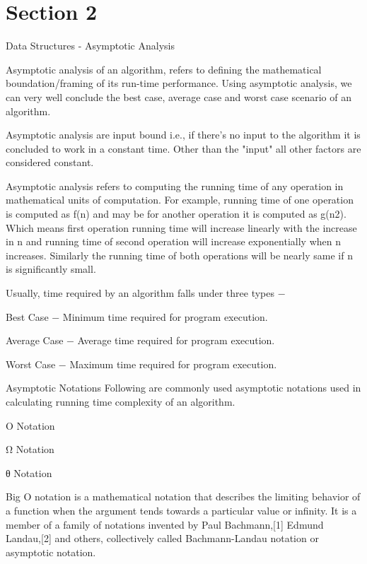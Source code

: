 \documentclass{beamer}
\begin{document}
\section{Section 2}
\begin{frame}

Data Structures - Asymptotic Analysis
 
Asymptotic analysis of an algorithm, refers to defining the mathematical boundation/framing of its run-time performance. Using asymptotic analysis, we can very well conclude the best case, average case and worst case scenario of an algorithm.

Asymptotic analysis are input bound i.e., if there's no input to the algorithm it is concluded to work in a constant time. Other than the "input" all other factors are considered constant.

Asymptotic analysis refers to computing the running time of any operation in mathematical units of computation. For example, running time of one operation is computed as f(n) and may be for another operation it is computed as g(n2). Which means first operation running time will increase linearly with the increase in n and running time of second operation will increase exponentially when n increases. Similarly the running time of both operations will be nearly same if n is significantly small.
\end{frame}
\begin{frame}

Usually, time required by an algorithm falls under three types −

Best Case − Minimum time required for program execution.

Average Case − Average time required for program execution.

Worst Case − Maximum time required for program execution.
\end{frame}
\begin{frame}
Asymptotic Notations
Following are commonly used asymptotic notations used in calculating running time complexity of an algorithm.

Ο Notation

Ω Notation

θ Notation
\end{frame}
\begin{frame}
Big O notation is a mathematical notation that describes the limiting behavior of a function when the argument tends towards a particular value or infinity. It is a member of a family of notations invented by Paul Bachmann,[1] Edmund Landau,[2] and others, collectively called Bachmann-Landau notation or asymptotic notation.
\end{frame}
\end{document}
